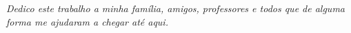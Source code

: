 \begin{dedicatoria}
   \vspace*{\fill}
   \centering
   \noindent
   \textit{Dedico este trabalho a minha família, amigos, professores e todos que de alguma forma me ajudaram a chegar até aqui.}
   \vspace*{\fill}
\end{dedicatoria}
